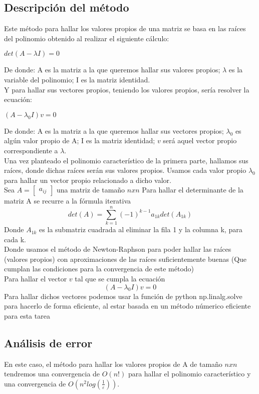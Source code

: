 
\subsection{Descripción del método}
Este método para hallar los valores propios de una matriz se basa en las raíces del polinomio obtenido al realizar el siguiente cálculo:\\ \begin{center}
   $det(A-\lambda I) = 0$
\end{center}
De donde: A es la matriz a la que queremos hallar sus valores propios; $\lambda$ es la variable del polinomio; I es la matriz identidad.\\

Y para hallar sus vectores propios, teniendo los valores propios, sería resolver la ecuación:\\ \begin{center}
    $(A-\lambda_0 I)v = 0$
\end{center}

De donde: A es la matriz a la que queremos hallar sus vectores propios; $\lambda_0$ es algún valor propio de A; I es la matriz identidad; $v$ será aquel vector propio correspondiente a $\lambda$. \\

Una vez planteado el polinomio característico de la primera parte, hallamos sus raíces, donde dichas raíces serán sus valores propios. Usamos cada valor propio $\lambda_0$ para hallar un vector propio relacionado a dicho valor.\\

Sea $A= \begin{bmatrix}a_{ij}\end{bmatrix}$ una matriz de tamaño $nxn$
Para hallar el determinante de la matriz A se recurre a la fórmula iterativa $$det(A)=\sum_{k=1}^n (-1)^{k-1}a_{1k}det(A_{1k})$$ 
Donde $A_{1k}$ es la submatriz cuadrada al eliminar la fila 1 y la columna k, para cada k.\\
Donde usamos el método de Newton-Raphson para poder hallar las raíces (valores propios) con aproximaciones de las raíces suficientemente buenas (Que cumplan las condiciones para la convergencia de este método)\\
Para hallar el vector $v$ tal que se cumpla la ecuación $$(A-\lambda_0 I)v=0$$ Para hallar dichos vectores podemos usar la función de python np.linalg.solve para hacerlo de forma eficiente, al estar basada en un método númerico eficiente para esta tarea

\subsection{Análisis de error}
En este caso, el método para hallar los valores propios de A de tamaño $nxn$ tendremos una convergencia de $O(n!)$ para hallar el polinomio característico y una convergencia de $O(n^2log(\frac{1}{\varepsilon}))$.
